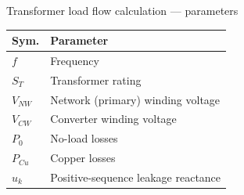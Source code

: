 \begin{frame}{Transformer load flow calculation --- parameters}
  \renewcommand{\arraystretch}{1.3}
  \begin{tabular}{@{}p{1.4cm}p{9.0cm}@{}}
    \textbf{Sym.} & \textbf{Parameter} \\
    \hline
    $f$        & Frequency \\
    $S_T$      & Transformer rating \\
    $V_{NW}$   & Network (primary) winding voltage \\
    $V_{CW}$   & Converter winding voltage \\
    $P_0$      & No-load losses \\
    $P_{Cu}$   & Copper losses \\
    $u_k$      & Positive-sequence leakage reactance \\
  \end{tabular}
\end{frame}
